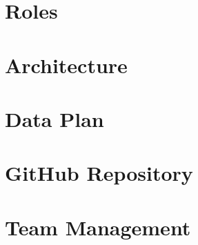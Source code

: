 \documentclass[12pt]{article}
\begin{document}
\section{Roles}


\section{Architecture}




\section{Data Plan}



\section{GitHub Repository}



\section{Team Management}






 
\end{document}
